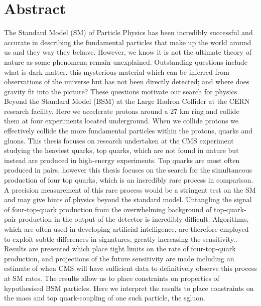 \label{c:abstract}
\chapter*{Abstract} 

The Standard Model (SM) of Particle Physics has been incredibly successful and accurate in describing the fundamental particles that make up the world around us and they way they behave. However, we know it is not the ultimate theory of nature as some phenomena remain unexplained. Outstanding questions include what is dark matter, this mysterious material which can be inferred from observations of the universe but has not been directly detected; and where does gravity fit into the picture? These questions motivate our search for physics Beyond the Standard Model (BSM) at the Large Hadron Collider at the CERN research facility. Here we accelerate protons around a 27 km ring and collide them at four experiments located underground. When we collide protons we effectively collide the more fundamental particles within the protons, quarks and gluons.
This thesis focuses on research undertaken at the CMS experiment studying the heaviest quarks, top quarks, which are not found in nature but instead are produced in high-energy experiments. Top quarks are most often produced in pairs, however this thesis focuses on the search for the simultaneous production of four top quarks, which is an incredibly rare process in comparison. A precision measurement of this rare process would be a stringent test on the SM and may give hints of physics beyond the standard model. 
Untangling the signal of four-top-quark production from the overwhelming background of top-quark-pair production in the output of the detector is incredibly difficult. Algorithms, which are often used in developing artificial intelligence, are therefore employed to exploit subtle differences in signatures, greatly increasing the sensitivity..
Results are presented which place tight limits on the rate of four-top-quark production, and projections of the future sensitivity are made including an estimate of when CMS will have sufficient data to definitively observe this process at SM rates. The results allow us to place constraints on properties of hypothesised BSM particles. Here we interpret the results to place constraints on the mass and top quark-coupling of one such particle, the sgluon.
